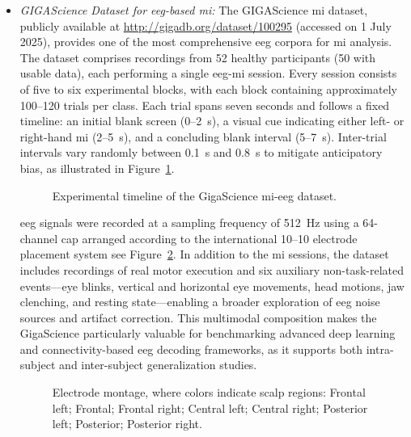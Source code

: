 \begin{itemize}
    \item[--] \textit{GIGAScience Dataset for \gls{eeg}-based \gls{mi}:} The GIGAScience \gls{mi} dataset, publicly available at \url{http://gigadb.org/dataset/100295} (accessed on 1 July 2025), provides one of the most comprehensive \gls{eeg} corpora for \gls{mi} analysis. The dataset comprises recordings from 52 healthy participants (50 with usable data), each performing a single \gls{eeg}-\gls{mi} session. Every session consists of five to six experimental blocks, with each block containing approximately 100–120 trials per class. Each trial spans seven seconds and follows a fixed timeline: an initial blank screen (0–2~s), a visual cue indicating either left- or right-hand \gls{mi} (2–5~s), and a concluding blank interval (5–7~s). Inter-trial intervals vary randomly between 0.1~s and 0.8~s to mitigate anticipatory bias, as illustrated in Figure~\ref{fig:giga_timeline}.

    \begin{figure}[htbp]
      \centering
      
      \caption{Experimental timeline of the GigaScience \gls{mi}-\gls{eeg} dataset.}
      \label{fig:giga_timeline}
    \end{figure}    
    
    \gls{eeg} signals were recorded at a sampling frequency of 512~Hz using a 64-channel cap arranged according to the international 10--10 electrode placement system see Figure~\ref{fig:giga_montage}. In addition to the \gls{mi} sessions, the dataset includes recordings of real motor execution and six auxiliary non-task-related events—eye blinks, vertical and horizontal eye movements, head motions, jaw clenching, and resting state—enabling a broader exploration of \gls{eeg} noise sources and artifact correction. This multimodal composition makes the GigaScience particularly valuable for benchmarking advanced deep learning and connectivity-based \gls{eeg} decoding frameworks, as it supports both intra-subject and inter-subject generalization studies.

    \begin{figure}[htbp]
      \centering
      \resizebox{0.4\linewidth}{!}{}
      \caption{Electrode montage, where colors indicate scalp regions:
      \protect{} Frontal left;
      \protect{} Frontal;
      \protect{} Frontal right;
      \protect{} Central left;
      \protect{} Central right;
      \protect{} Posterior left;
      \protect{} Posterior;
      \protect{} Posterior right.} 
      \label{fig:giga_montage}
    \end{figure}


\end{itemize}
